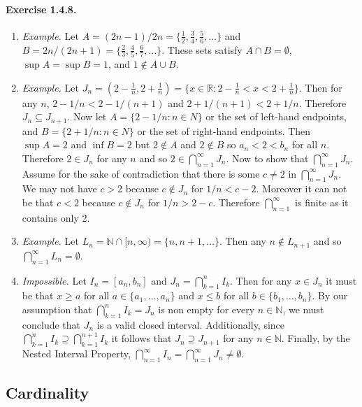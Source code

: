 \documentclass{article}
\newcommand{\N}{\mathbb{N}}
\newcommand{\R}{\mathbb{R}}
\newcommand{\nth}{\frac{1}{n}}
\begin{document}
\paragraph{Exercise 1.4.8.}
\begin{enumerate}
    \item \textit{Example.} Let $A = (2n-1)/2n = \{ \frac{1}{2}, \frac{3}{4}, \frac{5}{6}, \ldots \}$ and $B = 2n/(2n+1) = \{ \frac{2}{3}, \frac{4}{5}, \frac{6}{7}, \ldots\}$. These sets satisfy $A \cap B = \emptyset$, $\sup A = \sup B = 1$, and $1\notin A \cup B$.
    \item \textit{Example.} Let $J_n = (2-\nth, 2+\nth) = \{ x \in \R : 2-\nth < x < 2+\nth \}$. Then for any $n$, $2-1/n < 2-1/(n+1)$ and $2+1/(n+1) < 2+1/n$. Therefore $J_n \subseteq J_{n+1}$. Now let $A = \{ 2-1/n : n\in N\}$ or the set of left-hand endpoints, and $B = \{ 2+1/n: n\in N\}$ or the set of right-hand endpoints. Then $\sup A = 2$ and $\inf B = 2$ but $2\notin A$ and $2\notin B$ so  $a_n < 2 < b_n$ for all $n$. Therefore $2\in J_n$ for any $n$ and so $2\in \bigcap_{n=1}^\infty J_n$. Now to show that $\bigcap_{n=1}^\infty J_n$. Assume for the sake of contradiction that there is some $c \neq 2$ in  $\bigcap_{n=1}^\infty J_n$. We may not have $c > 2$ because $c\notin J_n$ for $1/n < c-2$. Moreover it can not be that $c < 2$ because $c\notin J_n$ for $1/n>2-c$. Therefore $\bigcap_{n=1}^\infty$ is finite as it contains only 2.
    \item \textit{Example.} Let $L_n = \N \cap [n,\infty) = \{ n, n+1, \ldots \}$. Then any $n \notin L_{n+1}$ and so $\bigcap_{n=1}^\infty L_n = \emptyset$.
    \item \textit{Impossible.} Let $I_n = [a_n, b_n]$ and $J_n = \bigcap_{k=1}^n I_k$. 
    Then for any $x \in J_n$ it must be that $x \geq a$ for all $a \in \{a_1, \ldots, a_n\}$ and $x\leq b$ for all $b \in \{b_1, \ldots, b_n\}$. By our assumption that $\bigcap_{k=1}^n I_k = J_n$ is non empty for every $n\in \N$, we must conclude that $J_n$ is a valid closed interval. Additionally, since $\bigcap_{k=1}^n I_k \supseteq \bigcap_{k=1}^{n+1} I_k$ it follows that $J_n \supseteq J_{n+1}$ for any $n \in \N$. Finally, by the Nested Interval Property, $\bigcap_{n=1} ^\infty I_n = \bigcap_{n=1}^\infty J_n \neq \emptyset$.
\end{enumerate}




\subsection{Cardinality}
\end{document}
